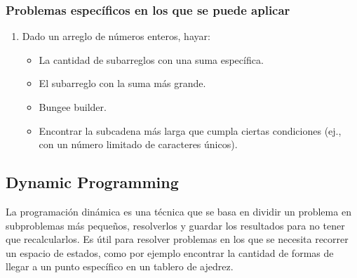 \subsubsection{Problemas específicos en los que se puede aplicar}
\begin{enumerate}
  \item Dado un arreglo de números enteros, hayar:
  \begin{itemize}
    \item La cantidad de subarreglos con una suma específica. 
    \item El subarreglo con la suma más grande. 
    \item Bungee builder. 
    \item Encontrar la subcadena más larga que cumpla ciertas condiciones (ej., con un número limitado de caracteres únicos).
  \end{itemize}
\end{enumerate}

\subsection{Dynamic Programming}
La programación dinámica es una técnica que se basa en dividir un problema en subproblemas más pequeños, resolverlos y guardar los resultados para no tener que recalcularlos. Es útil para resolver problemas en los que se necesita recorrer un espacio de estados, como por ejemplo encontrar la cantidad de formas de llegar a un punto específico en un tablero de ajedrez. 

